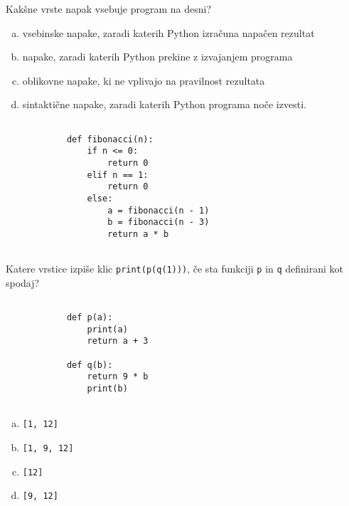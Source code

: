 \documentclass[arhiv, 10pt]{../izpit}
\newcommand{\inlinepy}[1]{\texttt{#1}}
\begin{document}
        \naloga*
        \begin{multicols}{2}
        \noindent
        Kakšne vrste napak vsebuje program na desni?

        \begin{enumerate}[(a)]
\item vsebinske napake, zaradi katerih Python izračuna napačen rezultat
\item napake, zaradi katerih Python prekine z izvajanjem programa
\item oblikovne napake, ki ne vplivajo na pravilnost rezultata
\item sintaktične napake, zaradi katerih Python programa noče izvesti.
\end{enumerate}

        \columnbreak

        \begin{verbatim}
        
            def fibonacci(n):
                if n <= 0:
                    return 0
                elif n == 1:
                    return 0
                else:
                    a = fibonacci(n - 1)
                    b = fibonacci(n - 3)
                    return a * b
            
        \end{verbatim}

        \end{multicols}

    
        \naloga*
        Katere vrstice izpiše klic \inlinepy{print(p(q(1)))}, če sta funkciji \inlinepy{p} in \inlinepy{q} definirani kot spodaj?

        \begin{multicols}{2}
        \begin{verbatim}
        
            def p(a):
                print(a)
                return a + 3

            def q(b):
                return 9 * b
                print(b)
        
        \end{verbatim}

        \begin{enumerate}[(a)]
\item \inlinepy{[1, 12]}
\item \inlinepy{[1, 9, 12]}
\item \inlinepy{[12]}
\item \inlinepy{[9, 12]}
\end{enumerate}

        \end{multicols}
    
\end{document}

